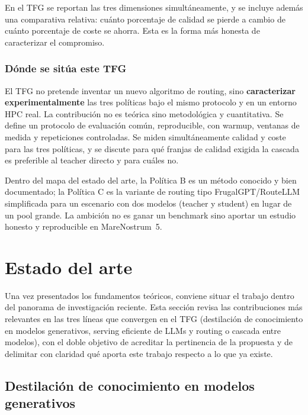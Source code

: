 \documentclass[11pt,a4paper]{article}
\begin{document}
En el TFG se reportan las tres dimensiones simultáneamente, y se incluye además una comparativa relativa: cuánto porcentaje de calidad se pierde a cambio de cuánto porcentaje de coste se ahorra. Esta es la forma más honesta de caracterizar el compromiso.

\subsubsection{Dónde se sitúa este TFG}

El TFG no pretende inventar un nuevo algoritmo de routing, sino \textbf{caracterizar experimentalmente} las tres políticas bajo el mismo protocolo y en un entorno HPC real. La contribución no es teórica sino metodológica y cuantitativa. Se define un protocolo de evaluación común, reproducible, con warmup, ventanas de medida y repeticiones controladas. Se miden simultáneamente calidad y coste para las tres políticas, y se discute para qué franjas de calidad exigida la cascada es preferible al teacher directo y para cuáles no.

Dentro del mapa del estado del arte, la Política B es un método conocido y bien documentado; la Política C es la variante de routing tipo FrugalGPT/RouteLLM simplificada para un escenario con dos modelos (teacher y student) en lugar de un pool grande. La ambición no es ganar un benchmark sino aportar un estudio honesto y reproducible en MareNostrum~5.

\section{Estado del arte}
\label{sec:estado-del-arte}

Una vez presentados los fundamentos teóricos, conviene situar el trabajo dentro del panorama de investigación reciente. Esta sección revisa las contribuciones más relevantes en las tres líneas que convergen en el TFG (destilación de conocimiento en modelos generativos, serving eficiente de LLMs y routing o cascada entre modelos), con el doble objetivo de acreditar la pertinencia de la propuesta y de delimitar con claridad qué aporta este trabajo respecto a lo que ya existe.

\subsection{Destilación de conocimiento en modelos generativos}
\end{document}
